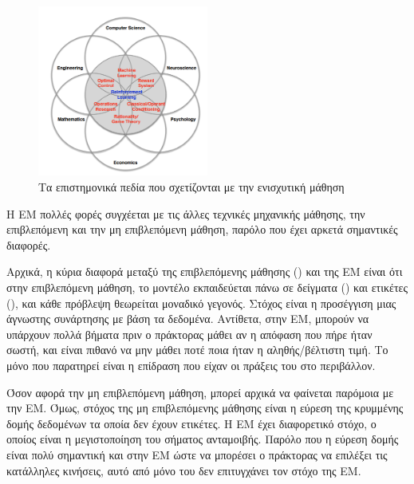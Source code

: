 \begin{figure}
    \includegraphics[width=0.5\textwidth]{body_matter/reinforcement_learning/images/faces_of_rl.png}
    \Centering
    \caption{Τα επιστημονικά πεδία που σχετίζονται με την ενισχυτική μάθηση \cite{silver2015}}
    \label{fig:faces_rl}
\end{figure}

Η ΕΜ πολλές φορές συγχέεται με τις άλλες τεχνικές μηχανικής μάθησης, την επιβλεπόμενη και την μη επιβλεπόμενη μάθηση,
παρόλο που έχει αρκετά σημαντικές διαφορές.

Αρχικά, η κύρια διαφορά μεταξύ της επιβλεπόμενης μάθησης () και της ΕΜ είναι ότι στην επιβλεπόμενη
μάθηση, το μοντέλο εκπαιδεύεται πάνω σε δείγματα () και ετικέτες (), και κάθε πρόβλεψη θεωρείται
μοναδικό γεγονός. Στόχος είναι η προσέγγιση μιας άγνωστης συνάρτησης με βάση τα δεδομένα.
Αντίθετα, στην ΕΜ, μπορούν να υπάρχουν πολλά βήματα πριν ο πράκτορας μάθει αν η απόφαση που πήρε ήταν
σωστή, και είναι πιθανό να μην μάθει ποτέ ποια ήταν η αληθής/βέλτιστη τιμή. Το μόνο που παρατηρεί είναι η
επίδραση που είχαν οι πράξεις του στο περιβάλλον.

Όσον αφορά την μη επιβλεπόμενη μάθηση, μπορεί αρχικά να φαίνεται παρόμοια με την ΕΜ. Όμως, στόχος της μη επιβλεπόμενης μάθησης
είναι η εύρεση της κρυμμένης δομής δεδομένων τα οποία δεν έχουν ετικέτες. Η ΕΜ έχει διαφορετικό στόχο, ο οποίος είναι η
μεγιστοποίηση του σήματος ανταμοιβής. Παρόλο που η εύρεση δομής είναι πολύ σημαντική και στην ΕΜ ώστε να μπορέσει ο πράκτορας
να επιλέξει τις κατάλληλες κινήσεις, αυτό από μόνο του δεν επιτυγχάνει τον στόχο της ΕΜ.

